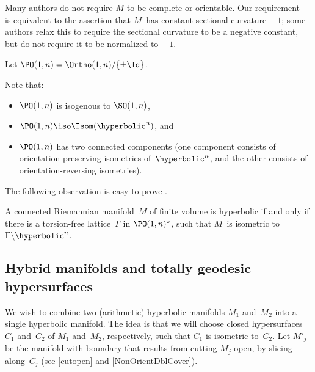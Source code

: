\begin{terminology}
 Many authors do not require $M$ to be complete or
orientable. Our requirement~ is
equivalent to the assertion that $M$~has constant sectional
curvature~$-1$; some authors relax this to require the
sectional curvature to be a negative constant, but do not
require it to be normalized to~$-1$.
 \end{terminology}

\begin{notation}
 Let 
 $\PO(1,n) = \Ortho(1,n)/ \{\pm \Id\}$.

Note that:
 \begin{itemize}
 \item $\PO(1,n)$ is isogenous to $\SO(1,n)$,
 \item $\PO(1,n) \iso \Isom(\hyperbolic^n)$, and
 \item $\PO(1,n)$ has two connected components (one
component consists of orientation-preserving isometries
of~$\hyperbolic^n$, and the other consists of
orientation-reversing isometries).
 \end{itemize}
 \end{notation}

The following observation is easy to prove
.

\begin{prop} \label{HyperMfld<>lattice}
 A connected Riemannian manifold~$M$ of finite volume is
hyperbolic if and only if there is a torsion-free
lattice~$\Gamma$ in $\PO(1,n)^\circ$, such that $M$~is
isometric to $\Gamma \backslash \hyperbolic^n$.
 \end{prop}



\subsection{Hybrid manifolds and totally geodesic
hypersurfaces}

We wish to combine two (arithmetic) hyperbolic manifolds
$M_1$ and~$M_2$ into a single hyperbolic manifold. The idea
is that we will choose closed hypersurfaces
$C_1$ and~$C_2$ of $M_1$ and~$M_2$, respectively, such that
$C_1$ is isometric to~$C_2$. Let $M'_j$ be the manifold with
boundary that results from cutting $M_j$ open, by slicing
along~$C_j$ (see \cref{cutopen} and
\cref{NonOrientDblCover}). 



